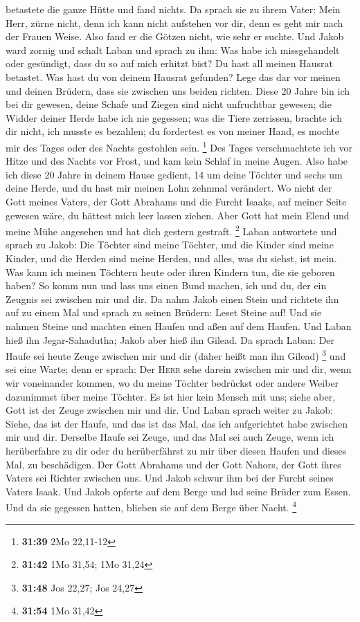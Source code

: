 betastete die ganze Hütte und fand nichts.  Da sprach sie
zu ihrem Vater: Mein Herr, zürne nicht, denn ich kann nicht aufstehen
vor dir, denn es geht mir nach der Frauen Weise. Also fand er die Götzen
nicht, wie sehr er suchte.  Und Jakob ward zornig und
schalt Laban und sprach zu ihm: Was habe ich missgehandelt oder
gesündigt, dass du so auf mich erhitzt bist?  Du hast all
meinen Hausrat betastet. Was hast du von deinem Hausrat gefunden? Lege
das dar vor meinen und deinen Brüdern, dass sie zwischen uns beiden
richten.  Diese 20 Jahre bin ich bei dir gewesen, deine
Schafe und Ziegen sind nicht unfruchtbar gewesen; die Widder deiner
Herde habe ich nie gegessen;  was die Tiere zerrissen,
brachte ich dir nicht, ich musste es bezahlen; du fordertest es von
meiner Hand, es mochte mir des Tages oder des Nachts gestohlen sein.
\footnote{\textbf{31:39} 2Mo 22,11-12}  Des Tages
verschmachtete ich vor Hitze und des Nachts vor Frost, und kam kein
Schlaf in meine Augen.  Also habe ich diese 20 Jahre in
deinem Hause gedient, 14 um deine Töchter und sechs um deine Herde, und
du hast mir meinen Lohn zehnmal verändert.  Wo nicht der
Gott meines Vaters, der Gott Abrahams und die Furcht Isaaks, auf meiner
Seite gewesen wäre, du hättest mich leer lassen ziehen. Aber Gott hat
mein Elend und meine Mühe angesehen und hat dich gestern gestraft.
\footnote{\textbf{31:42} 1Mo 31,54; 1Mo 31,24}  Laban
antwortete und sprach zu Jakob: Die Töchter sind meine Töchter, und die
Kinder sind meine Kinder, und die Herden sind meine Herden, und alles,
was du siehst, ist mein. Was kann ich meinen Töchtern heute oder ihren
Kindern tun, die sie geboren haben?  So komm nun und lass
uns einen Bund machen, ich und du, der ein Zeugnis sei zwischen mir und
dir.  Da nahm Jakob einen Stein und richtete ihn auf zu
einem Mal  und sprach zu seinen Brüdern: Leset Steine
auf! Und sie nahmen Steine und machten einen Haufen und aßen auf dem
Haufen.  Und Laban hieß ihn Jegar-Sahadutha; Jakob aber
hieß ihn Gilead.  Da sprach Laban: Der Haufe sei heute
Zeuge zwischen mir und dir (daher heißt man ihn Gilead) \footnote{\textbf{31:48}
  Jos 22,27; Jos 24,27}  und sei eine Warte; denn er
sprach: Der \textsc{Herr} sehe darein zwischen mir und dir, wenn wir
voneinander kommen,  wo du meine Töchter bedrückst oder
andere Weiber dazunimmst über meine Töchter. Es ist hier kein Mensch mit
uns; siehe aber, Gott ist der Zeuge zwischen mir und dir.
 Und Laban sprach weiter zu Jakob: Siehe, das ist der
Haufe, und das ist das Mal, das ich aufgerichtet habe zwischen mir und
dir.  Derselbe Haufe sei Zeuge, und das Mal sei auch
Zeuge, wenn ich herüberfahre zu dir oder du herüberfährst zu mir über
diesen Haufen und dieses Mal, zu beschädigen.  Der Gott
Abrahams und der Gott Nahors, der Gott ihres Vaters sei Richter zwischen
uns.  Und Jakob schwur ihm bei der Furcht seines Vaters
Isaak. Und Jakob opferte auf dem Berge und lud seine Brüder zum Essen.
Und da sie gegessen hatten, blieben sie auf dem Berge über Nacht.
\footnote{\textbf{31:54} 1Mo 31,42}

